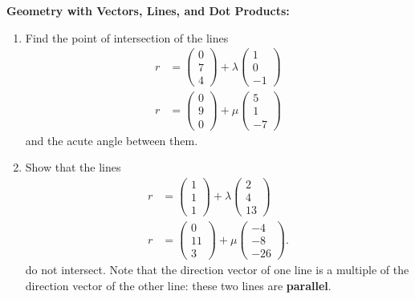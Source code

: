 \documentclass{article}
\begin{document}
\clearpage



\textbf{Geometry with Vectors, Lines, and Dot Products:}\bigskip



\begin{enumerate}
	\item Find the point of intersection of the lines
		\begin{align*}
			r&=\left(\begin{array}{c}0\\7\\4\end{array}\right)+\lambda \left(\begin{array}{c}1\\0\\-1\end{array}\right)\\
			r&= \left(\begin{array}{c}0\\9\\0\end{array}\right)+ \mu\left(\begin{array}{c}5\\1\\-7\end{array}\right)
		\end{align*}
		and the acute angle between them.
	\item Show that the lines
		\begin{align*}
			r&=\left(\begin{array}{c}1\\1\\1\end{array}\right)+\lambda \left(\begin{array}{c}2\\4\\13\end{array}\right)\\
			r&= \left(\begin{array}{c}0\\11\\3\end{array}\right)+ \mu\left(\begin{array}{c}-4\\-8\\-26\end{array}\right).
		\end{align*}
		do not intersect. Note that the direction vector of one line is a multiple of the direction vector of the other line: these two lines are \textbf{parallel}.

\end{enumerate}
\end{document}
